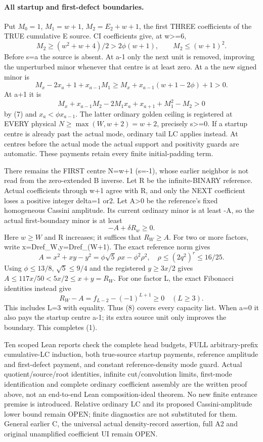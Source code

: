 \paragraph{All startup and first-defect boundaries.}
Put $M_0=1$, $M_1=w+1$, $M_2=E_2+w+1$, the first THREE coefficients
of the TRUE cumulative E source. CI coefficients give, at w>=6,
\[
 M_2\ge(w^2+w+4)/2>2\phi(w+1),\qquad M_2\le(w+1)^2.   \tag{7}
\]
Before s=a the source is absent. At a-1 only the next unit is removed,
improving the unperturbed minor whenever that centre is at least zero.
At a the new signed minor is
\[
 M_x-2x_a+1+x_{a-1}M_1
 \ge M_x+x_{a-1}(w+1-2\phi)+1>0.
\]
At a+1 it is
\[
 M_x+x_{a-1}M_2-2M_1x_a+x_{a+1}+M_1^2-M_2>0
\]
by (7) and $x_a<\phi x_{a-1}$.
The latter ordinary golden ceiling is registered at EVERY
physical $N\ge\max(W,w+2)=w+2$, precisely s>=0.
If a startup centre is already past the actual mode, ordinary tail LC
applies instead. At centres before the actual mode the actual support
and positivity guards are automatic. These payments retain every
finite initial-padding term.

There remains the FIRST centre N=w+1 (s=-1), whose earlier neighbor
is not read from the zero-extended B inverse.
Let R be the infinite-BINARY reference. Actual coefficients through
w+1 agree with R, and only the NEXT coefficient loses a positive
integer delta=1 or2. Let A>0 be the reference's fixed homogeneous
Cassini amplitude. Its current ordinary minor is at least -A,
so the actual first-boundary minor is at least
\[
                          -A+\delta R_w\ge0.          \tag{8}
\]
Here $w\ge W$ and R increases; it suffices that $R_W\ge A$.
For two or more factors, write x=Dref_W,y=Dref_(W+1).
The exact reference norm gives
\[
 A=x^2+xy-y^2=\phi\sqrt5\,\rho x-\phi^2\rho^2,\quad
 \rho\le(2q^2)^r\le16/25.
\]
Using $\phi\le13/8$, $\sqrt5\le9/4$ and the registered
$y\ge3x/2$ gives $A\le117x/50<5x/2\le x+y=R_W$.
For one factor L, the exact Fibonacci identities instead give
\[
 R_W-A=f_{L-2}-(-1)^{L+1}\ge0\quad(L\ge3).
\]
This includes L=3 with equality. Thus (8) covers every capacity list.
When a=0 it also pays the startup centre a-1; its extra source unit
only improves the boundary. This completes (1).

Ten scoped Lean reports check the complete head budgets, FULL
arbitrary-prefix cumulative-LC induction, both true-source startup
payments, reference amplitude and first-defect payment, and constant
reference-density mode guard. Actual quotient/source/root identities,
infinite cut/convolution limits, first-mode identification and complete
ordinary coefficient assembly are the written proof above, not an
end-to-end Lean composition-ideal theorem.
No new finite entrance premise is introduced.
Relative ordinary LC and its proposed Cassini-amplitude lower bound
remain OPEN; finite diagnostics are not substituted for them.
General earlier C, the universal actual density-record assertion,
full A2 and original unamplified coefficient UI remain OPEN.


